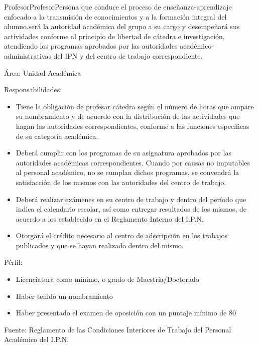 \begin{actor}{Profesor}{Profesor}{Persona que conduce el proceso de enseñanza-aprendizaje enfocado a la transmisión de conocimientos y a la formación integral del alumno.será la autoridad académica del grupo a su cargo y desempeñará sus actividades conforme al principio de libertad de cátedra e investigación, atendiendo los programas aprobados por las autoridades académico-administrativas del IPN y del centro de trabajo correspondiente.}
	
	
	\item[Área:] Unidad Académica
	
	\item[Responsabilidades:]\cdtEmpty
	\begin{itemize}
		\item Tiene la obligación de profesar cátedra según el número de
		horas que ampare su nombramiento y de acuerdo con la distribución de las actividades que hagan las
		autoridades correspondientes, conforme a las funciones específicas de su categoría académica.
		\item Deberá cumplir con los programas de su asignatura aprobados
		por las autoridades académicas correspondientes. Cuando por causas no imputables al personal
		académico, no se cumplan dichos programas, se convendrá la satisfacción de los mismos con las
		autoridades del centro de trabajo.
		\item Deberá realizar exámenes en su centro de trabajo y dentro del
		período que indica el calendario escolar, así como entregar resultados de los mismos, de acuerdo a los establecido en el Reglamento Interno del I.P.N.
		\item Otorgará el crédito necesario al centro de adscripción en los trabajos publicados y que se hayan realizado dentro del mismo.
	\end{itemize}
	
	\item[Pérfil:]\cdtEmpty
	\begin{itemize}
		\item Licenciatura como mínimo, o grado de Maestría/Doctorado
		\item Haber tenido un nombramiento
		\item Haber presentado el examen de oposición con un puntaje mínimo de 80
	\end{itemize}
	
	\item[Fuente:]Reglamento de las Condiciones Interiores de Trabajo del Personal Académico del I.P.N.
	
\end{actor}

